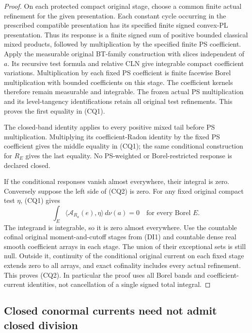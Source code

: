 \documentclass[11pt,a4paper]{article}
\numberwithin{equation}{section}
\theoremstyle{definition}
\theoremstyle{remark}
\begin{document}
\begin{proof}
On each protected compact original stage, choose a common finite
actual refinement for the given presentation. Each constant cycle
occurring in the prescribed compatible presentation has its specified
finite signed convex-PL presentation. Thus its response is a
finite signed sum of positive bounded classical mixed products,
followed by multiplication by the specified finite PS coefficient.
Apply the measurable original BT-family construction with slices
independent of \(a\). Its recursive test formula and relative CLN
give integrable compact coefficient variations. Multiplication by
each fixed PS coefficient is finite facewise Borel multiplication
with bounded coefficients on this stage. The coefficient kernels
therefore remain measurable and integrable. The frozen actual PS
multiplication and its level-tangency identifications retain all
original test refinements. This proves the first equality in (CQ1).

The closed-band identity applies to every positive mixed tail before
PS multiplication. Multiplying its coefficient-Radon identity by the
fixed PS coefficient gives the middle equality in (CQ1); the same
conditional construction for \(R_E\) gives the last equality. No
PS-weighted or Borel-restricted response is declared closed.

If the conditional responses vanish almost everywhere, their integral
is zero. Conversely suppose the left side of (CQ2) is zero. For any
fixed original compact test \(\eta\), (CQ1) gives
\[
        \int_E\langle\mathcal A_{R_a}(e),\eta\rangle\,d\nu(a)=0
                    \quad\text{for every Borel }E.
 \tag{CQ3}
\]
The integrand is integrable, so it is zero almost everywhere. Use
the countable cofinal original moment-and-cutoff stages from (DI1)
and countable dense real smooth coefficient arrays in each stage.
The union of their exceptional sets is still null. Outside it,
continuity of the conditional original current on each fixed stage
extends zero to all arrays, and exact cofinality includes every
actual refinement. This proves (CQ2). In particular the proof uses
all Borel bands and coefficient-current identities, not cancellation
of a single signed total integral.
\end{proof}

\subsection{Closed conormal currents need not admit closed division}
\end{document}
